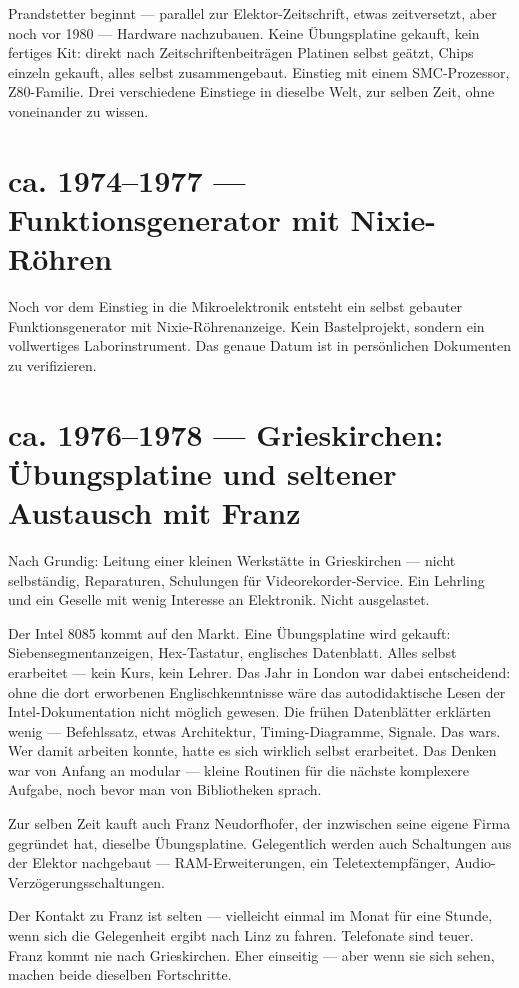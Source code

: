 \documentclass[a4paper,12pt]{article}
\begin{document}
Prandstetter beginnt --- parallel zur Elektor-Zeitschrift, etwas zeitversetzt, aber noch vor 1980 --- Hardware nachzubauen. Keine Übungsplatine gekauft, kein fertiges Kit: direkt nach Zeitschriftenbeiträgen Platinen selbst geätzt, Chips einzeln gekauft, alles selbst zusammengebaut. Einstieg mit einem SMC-Prozessor, Z80-Familie. Drei verschiedene Einstiege in dieselbe Welt, zur selben Zeit, ohne voneinander zu wissen.

\section{ca. 1974--1977 --- Funktionsgenerator mit Nixie-Röhren}

Noch vor dem Einstieg in die Mikroelektronik entsteht ein selbst gebauter Funktionsgenerator mit Nixie-Röhrenanzeige. Kein Bastelprojekt, sondern ein vollwertiges Laborinstrument. Das genaue Datum ist in persönlichen Dokumenten zu verifizieren.

\section{ca. 1976--1978 --- Grieskirchen: Übungsplatine und seltener Austausch mit Franz}

Nach Grundig: Leitung einer kleinen Werkstätte in Grieskirchen --- nicht selbständig, Reparaturen, Schulungen für Videorekorder-Service. Ein Lehrling und ein Geselle mit wenig Interesse an Elektronik. Nicht ausgelastet.

Der Intel 8085 kommt auf den Markt. Eine Übungsplatine wird gekauft: Siebensegmentanzeigen, Hex-Tastatur, englisches Datenblatt. Alles selbst erarbeitet --- kein Kurs, kein Lehrer. Das Jahr in London war dabei entscheidend: ohne die dort erworbenen Englischkenntnisse wäre das autodidaktische Lesen der Intel-Dokumentation nicht möglich gewesen. Die frühen Datenblätter erklärten wenig --- Befehlssatz, etwas Architektur, Timing-Diagramme, Signale. Das wars. Wer damit arbeiten konnte, hatte es sich wirklich selbst erarbeitet. Das Denken war von Anfang an modular --- kleine Routinen für die nächste komplexere Aufgabe, noch bevor man von Bibliotheken sprach.

Zur selben Zeit kauft auch Franz Neudorfhofer, der inzwischen seine eigene Firma gegründet hat, dieselbe Übungsplatine. Gelegentlich werden auch Schaltungen aus der Elektor nachgebaut --- RAM-Erweiterungen, ein Teletextempfänger, Audio-Verzögerungsschaltungen.

Der Kontakt zu Franz ist selten --- vielleicht einmal im Monat für eine Stunde, wenn sich die Gelegenheit ergibt nach Linz zu fahren. Telefonate sind teuer. Franz kommt nie nach Grieskirchen. Eher einseitig --- aber wenn sie sich sehen, machen beide dieselben Fortschritte.
\end{document}
